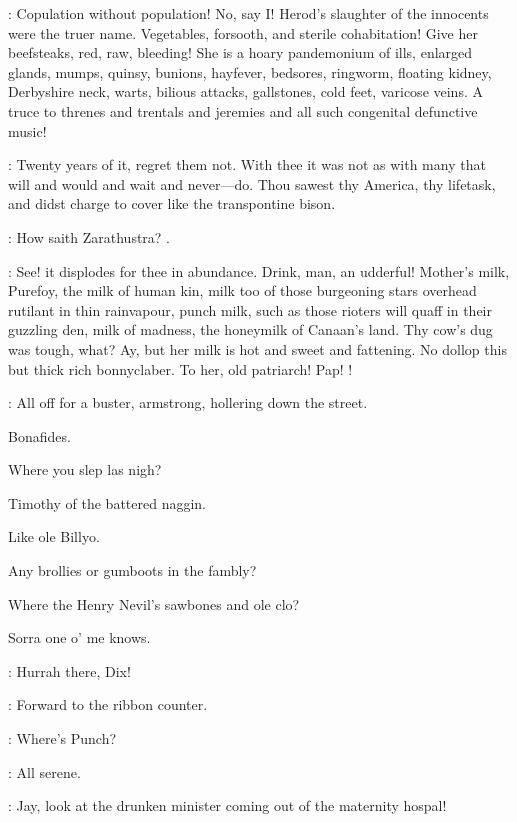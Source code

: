 :
Copulation without population!
No,
say I!
Herod's slaughter of the
innocents were the truer name.
Vegetables,
forsooth,
and sterile
cohabitation!
Give her beefsteaks,
red,
raw,
bleeding!
She is a hoary
pandemonium of ills,
enlarged glands,
mumps,
quinsy,
bunions,
hayfever,
bedsores,
ringworm,
floating kidney,
Derbyshire neck,
warts,
bilious
attacks,
gallstones,
cold feet,
varicose veins.
A truce to threnes and
trentals and jeremies and all such congenital defunctive music!

:
Twenty years of it,
regret them not.
With thee it was not as with
many that will and would and wait and never---do.
Thou sawest thy America,
thy lifetask,
and didst charge to cover like the transpontine bison.

:
How saith Zarathustra?
.

:
See!
it displodes for thee in abundance.
Drink,
man,
an
udderful!
Mother's milk,
Purefoy,
the milk of human kin,
milk too of
those burgeoning stars overhead rutilant in thin rainvapour,
punch milk,
such as those rioters will quaff in their guzzling den,
milk of madness,
the honeymilk of Canaan's land.
Thy cow's dug was tough,
what?
Ay,
but
her milk is hot and sweet and fattening.
No dollop this but thick rich
bonnyclaber.
To her,
old patriarch!
Pap!
!



:
All off for a buster,
armstrong,
hollering down the street.

Bonafides.

Where you slep las nigh?

Timothy of the battered naggin.

Like ole Billyo.

Any brollies or gumboots in the fambly?

Where the Henry Nevil's sawbones and ole clo?

Sorra one o' me knows.

\madden:
Hurrah there,
Dix!

:
Forward to the ribbon counter.

\dixon:
Where's Punch?

:
All serene.

\bystander:
Jay,
look at the drunken minister coming out of the maternity hospal!


